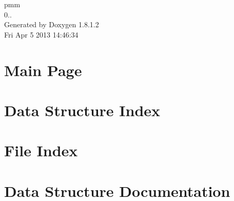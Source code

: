 \documentclass{book}
\begin{document}
\hypersetup{pageanchor=false,citecolor=blue}
\begin{titlepage}
\vspace*{7cm}
\begin{center}
{\Large pmm \\[1ex]\large 0.. }\\
\vspace*{1cm}
{\large Generated by Doxygen 1.8.1.2}\\
\vspace*{0.5cm}
{\small Fri Apr 5 2013 14:46:34}\\
\end{center}
\end{titlepage}
\clearemptydoublepage
{}
\tableofcontents
\clearemptydoublepage
{}
\hypersetup{pageanchor=true,citecolor=blue}
\chapter{Main Page}
\label{index}\hypertarget{index}{}
\chapter{Data Structure Index}

\chapter{File Index}

\chapter{Data Structure Documentation}




















\end{document}
